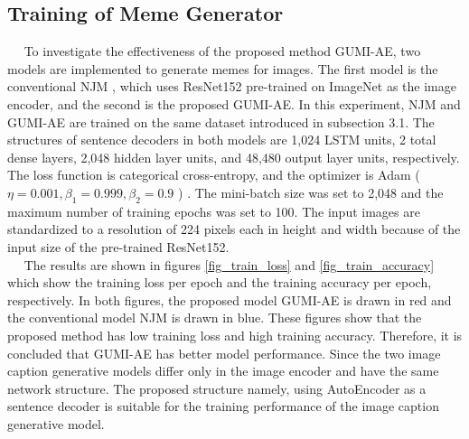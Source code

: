 \documentclass[runningheads]{llncs}
\begin{document}
\subsection{Training of Meme Generator}
~~ To investigate the effectiveness of the proposed method GUMI-AE, two models are implemented to generate memes for images. The first model is the conventional NJM \cite{ref_NJM}, which uses ResNet152 pre-trained on ImageNet \cite{ref_NJM,ref_ResNet152,ref_ImageNet} as the image encoder, and the second is the proposed GUMI-AE. In this experiment, NJM and GUMI-AE are trained on the same dataset introduced in subsection 3.1. The structures of sentence decoders in both models are 1,024 LSTM units, 2 total dense layers, 2,048 hidden layer units, and 48,480 output layer units, respectively. The loss function is categorical cross-entropy, and the optimizer is Adam ($ \eta = 0.001, \beta_1 = 0.999, \beta_2 = 0.9 $ ) \cite{ref_Adam}. The mini-batch size was set to 2,048 and the maximum number of training epochs was set to 100. The input images are standardized to a resolution of 224 pixels each in height and width because of the input size of the pre-trained ResNet152. \\
~~ The results are shown in figures \ref{fig_train_loss} and \ref{fig_train_accuracy} which show the training loss per epoch and the training accuracy per epoch, respectively. In both figures, the proposed model GUMI-AE is drawn in red and the conventional model NJM is drawn in blue. These figures show that the proposed method has low training loss and high training accuracy. Therefore, it is concluded that GUMI-AE has better model performance. Since the two image caption generative models differ only in the image encoder and have the same network structure. The proposed structure namely, using AutoEncoder as a sentence decoder is suitable for the training performance of the image caption generative model.\\
\end{document}
